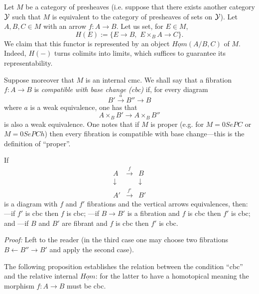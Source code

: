 Let $M$ be a category of presheaves (i.e. suppose that there
exists another category ${\cal Y}$ such that $M$ is equivalent to the
category of presheaves of sets on ${\cal Y}$). Let
$A,B,C\in M$ with
an arrow $f:A\rightarrow B$. Let us set, for $E\in M$,
$$
H(E):= \{ E\rightarrow B, \, \, E\times _BA\rightarrow C\} .
$$
We claim that this functor is represented by an object
$\underline{Hom}(A/B,
C)$ of $M$. Indeed, $H(-)$ turns colimits into limits,
which suffices
to guarantee its representability.

Suppose moreover that $M$ is an internal cmc. We shall say that a fibration
$f:A\rightarrow B$ is {\em compatible with base change (cbc)}
if, for
every diagram
$$
B'\stackrel{a}{\rightarrow} B'' \rightarrow B
$$
where $a$ is a weak equivalence, one has that
$$
A\times _BB'\rightarrow A\times _BB''
$$
is also a weak equivalence. One notes that if $M$ is proper
(e.g. for $M=0SePC$
or $M=0SePCh$) then every fibration is compatible with base
change---this is the definition of ``proper''.

\begin{lemma}
\label{ccb1}
If
$$
\begin{array}{ccc}
A&\stackrel{f}{\rightarrow}& B\\
\downarrow && \downarrow \\
A'&\stackrel{f'}{\rightarrow}& B'
\end{array}
$$
is a diagram with $f$ and $f'$ fibrations and the vertical arrows
equivalences, then:
\newline
---if $f'$ is cbc then $f$ is cbc;
\newline
---if $B\rightarrow B'$ is a fibration and $f$ is cbc then $f'$
is cbc; and
\newline
---if $B$ and $B'$ are fibrant and $f$ is cbc then $f'$ is cbc.
\end{lemma}
{\em Proof:}
Left to the reader (in the third case one may choose
two fibrations $B\leftarrow B'' \rightarrow B'$ and
apply the second case).
\eop

The following proposition establishes the relation between the condition
``cbc''
and the relative internal $\underline{Hom}$: for the latter to have a
homotopical meaning the morphism $f:A\rightarrow B$ must be cbc.

